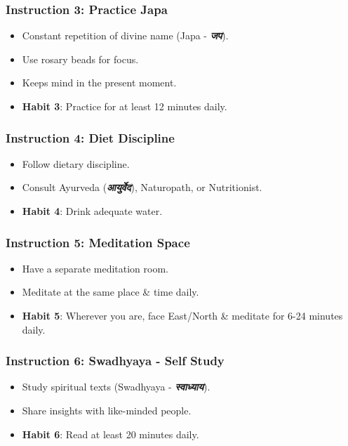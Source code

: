 \begin{frame}[fragile]\frametitle{Instruction 3: Practice Japa}
      \begin{itemize}
          \item Constant repetition of divine name (Japa - \textbf{\textit{जप}}).
          \item Use rosary beads for focus.
          \item Keeps mind in the present moment.
          \item \textbf{Habit 3}: Practice for at least 12 minutes daily.
      \end{itemize}
\end{frame}

\begin{frame}[fragile]\frametitle{Instruction 4: Diet Discipline}
      \begin{itemize}
          \item Follow dietary discipline.
          \item Consult Ayurveda (\textbf{\textit{आयुर्वेद}}), Naturopath, or Nutritionist.
          \item \textbf{Habit 4}: Drink adequate water.
      \end{itemize}
\end{frame}

\begin{frame}[fragile]\frametitle{Instruction 5: Meditation Space}
      \begin{itemize}
          \item Have a separate meditation room.
          \item Meditate at the same place \& time daily.
          \item \textbf{Habit 5}: Wherever you are, face East/North \& meditate for 6-24 minutes daily.
      \end{itemize}
\end{frame}

\begin{frame}[fragile]\frametitle{Instruction 6: Swadhyaya - Self Study}
      \begin{itemize}
          \item Study spiritual texts (Swadhyaya - \textbf{\textit{स्वाध्याय}}).
          \item Share insights with like-minded people.
          \item \textbf{Habit 6}: Read at least 20 minutes daily.
      \end{itemize}
\end{frame}

